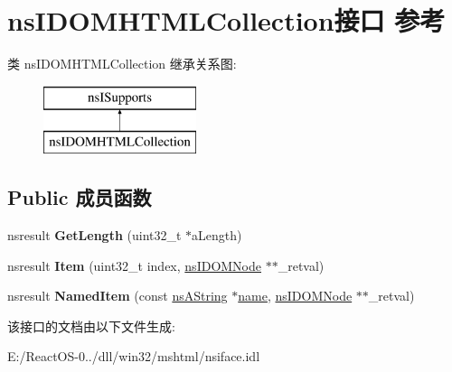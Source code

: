 \hypertarget{interfacens_i_d_o_m_h_t_m_l_collection}{}\section{ns\+I\+D\+O\+M\+H\+T\+M\+L\+Collection接口 参考}
\label{interfacens_i_d_o_m_h_t_m_l_collection}
类 ns\+I\+D\+O\+M\+H\+T\+M\+L\+Collection 继承关系图\+:\begin{figure}[H]
\begin{center}
\leavevmode
\includegraphics[height=2.000000cm]{interfacens_i_d_o_m_h_t_m_l_collection}
\end{center}
\end{figure}
\subsection*{Public 成员函数}
\begin{DoxyCompactItemize}
\item 
\mbox{\label{interfacens_i_d_o_m_h_t_m_l_collection_a0a07a9cc57264780480343cc73750381}} 
nsresult {\bfseries Get\+Length} (uint32\+\_\+t $\ast$a\+Length)
\item 
\mbox{\label{interfacens_i_d_o_m_h_t_m_l_collection_a63db4c993bf0e544e78f0648b2cf960a}} 
nsresult {\bfseries Item} (uint32\+\_\+t index, \hyperlink{interfacens_i_d_o_m_node}{ns\+I\+D\+O\+M\+Node} $\ast$$\ast$\+\_\+retval)
\item 
\mbox{\label{interfacens_i_d_o_m_h_t_m_l_collection_a74e04d13fe3c9d53a87a261ca7d2b384}} 
nsresult {\bfseries Named\+Item} (const \hyperlink{structns_string_container}{ns\+A\+String} $\ast$\hyperlink{structname}{name}, \hyperlink{interfacens_i_d_o_m_node}{ns\+I\+D\+O\+M\+Node} $\ast$$\ast$\+\_\+retval)
\end{DoxyCompactItemize}


该接口的文档由以下文件生成\+:\begin{DoxyCompactItemize}
\item 
E\+:/\+React\+O\+S-\/0../dll/win32/mshtml/nsiface.\+idl\end{DoxyCompactItemize}
